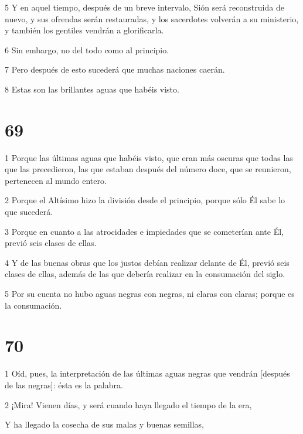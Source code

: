 \par 5 Y en aquel tiempo, después de un breve intervalo, Sión será reconstruida de nuevo, y sus ofrendas serán restauradas, y los sacerdotes volverán a su ministerio, y también los gentiles vendrán a glorificarla.

\par 6 Sin embargo, no del todo como al principio.

\par 7 Pero después de esto sucederá que muchas naciones caerán.

\par 8 Estas son las brillantes aguas que habéis visto.

\chapter{69}

\par 1 Porque las últimas aguas que habéis visto, que eran más oscuras que todas las que las precedieron, las que estaban después del número doce, que se reunieron, pertenecen al mundo entero.

\par 2 Porque el Altísimo hizo la división desde el principio, porque sólo Él sabe lo que sucederá.

\par 3 Porque en cuanto a las atrocidades e impiedades que se cometerían ante Él, previó seis clases de ellas.

\par 4 Y de las buenas obras que los justos debían realizar delante de Él, previó seis clases de ellas, además de las que debería realizar en la consumación del siglo.

\par 5 Por su cuenta no hubo aguas negras con negras, ni claras con claras; porque es la consumación.

\chapter{70}

\par 1 Oíd, pues, la interpretación de las últimas aguas negras que vendrán [después de las negras]: ésta es la palabra.

\par 2 ¡Mira! Vienen días, y será cuando haya llegado el tiempo de la era,

\par Y ha llegado la cosecha de sus malas y buenas semillas,

